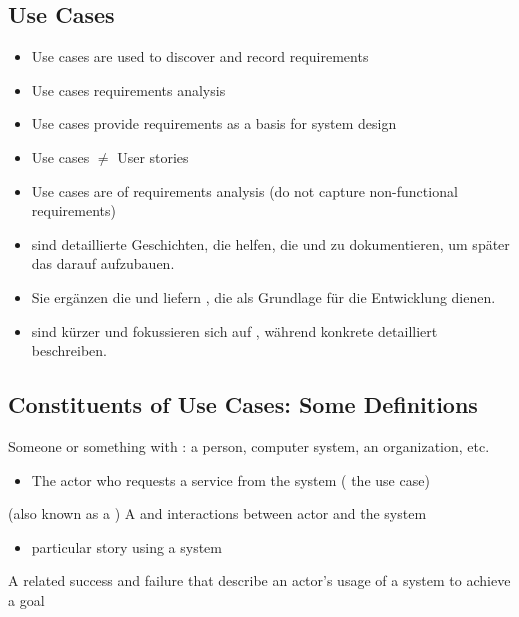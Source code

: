 \subsection{Use Cases}
\begin{defBox}
    \begin{itemize}
        \item Use cases are  used to discover and record requirements
        \item Use cases  requirements analysis
        \item Use cases provide  requirements as a basis for system design
    \end{itemize}
\end{defBox}
\begin{itemize}
    \item Use cases $\neq$ User stories
    \item Use cases are  of requirements analysis (do not capture non-functional requirements)
\end{itemize}

\begin{infoBox}
    \begin{itemize}
        \item {} sind detaillierte Geschichten, die helfen, die  und zu dokumentieren, um später das  darauf aufzubauen.
        \item Sie ergänzen die  und liefern , die als Grundlage für die Entwicklung dienen.
        \item {} sind kürzer und fokussieren sich auf , während  konkrete  detailliert beschreiben.
    \end{itemize}
\end{infoBox}

\subsection{Constituents of Use Cases: Some Definitions}
 Someone or something with : a person, computer system, an organization, etc.
\begin{itemize}
    \item {} The actor who requests a service from the system ( the use case)
\end{itemize}
 (also known as a ) A  and interactions between actor and the system
\begin{itemize}
    \item {} particular story using a system
\end{itemize}
 A  related success and failure  that describe an actor's usage of a system to achieve a goal

